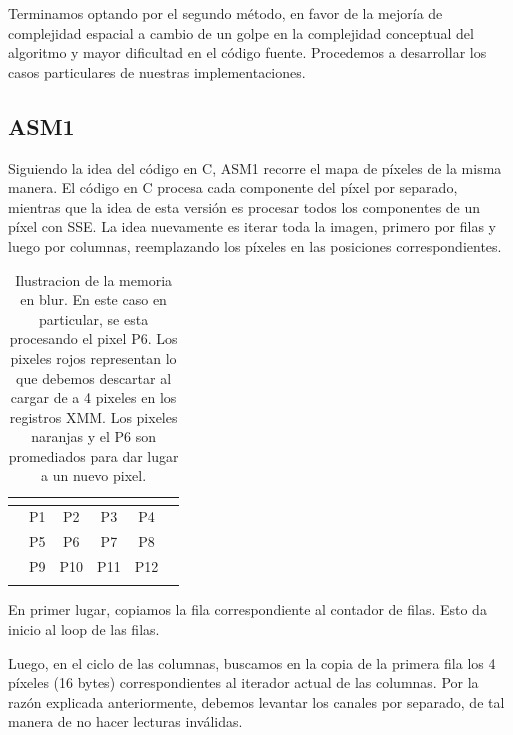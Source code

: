 Terminamos optando por el segundo método, en favor de la mejoría de complejidad espacial a cambio de un golpe en la complejidad conceptual del algoritmo y mayor dificultad en el código fuente. Procedemos a desarrollar los casos particulares de nuestras implementaciones.

\subsection{ASM1}

Siguiendo la idea del código en C, ASM1 recorre el mapa de píxeles de la misma manera. El código en C procesa cada componente del píxel por separado, mientras que la idea de esta versión es procesar todos los componentes de un píxel con SSE. La idea nuevamente es iterar toda la imagen, primero por filas y luego por columnas, reemplazando los píxeles en las posiciones correspondientes.

\begin{table}[h]
\centering
\mem
\begin{tabular}{l|c|c|c|c|l}
 & \multicolumn{1}{l|}{}      & \multicolumn{1}{l|}{}       & \multicolumn{1}{l|}{}       & \multicolumn{1}{l|}{}       &  \\ \hline
 & \cellcolor[HTML]{FFCB2F}P1 & \cellcolor[HTML]{FFCB2F}P2  & \cellcolor[HTML]{FFCB2F}P3  & \cellcolor[HTML]{FD6864}P4  &  \\ \hline
 & \cellcolor[HTML]{FFCB2F}P5 & \cellcolor[HTML]{FFFC9E}P6  & \cellcolor[HTML]{FFCB2F}P7  & \cellcolor[HTML]{FD6864}P8  &  \\ \hline
 & \cellcolor[HTML]{FFCB2F}P9 & \cellcolor[HTML]{FFCB2F}P10 & \cellcolor[HTML]{FFCB2F}P11 & \cellcolor[HTML]{FD6864}P12 &  \\ \hline
 & \multicolumn{1}{l|}{}      & \multicolumn{1}{l|}{}       & \multicolumn{1}{l|}{}       & \multicolumn{1}{l|}{}       & 
\end{tabular}
\caption{Ilustracion de la memoria en blur. En este caso en particular, se esta procesando el pixel P6. Los pixeles rojos representan lo que debemos descartar al cargar de a 4 pixeles en los registros XMM. Los pixeles naranjas y el P6 son promediados para dar lugar a un nuevo pixel.}
\end{table}

En primer lugar, copiamos la fila correspondiente al contador de filas. Esto da inicio al loop de las filas.


Luego, en el ciclo de las columnas, buscamos en la copia de la primera fila los 4 píxeles (16 bytes) correspondientes al iterador actual de las columnas.
Por la razón explicada anteriormente, debemos levantar los canales por separado, de tal manera de no hacer lecturas inválidas. 

